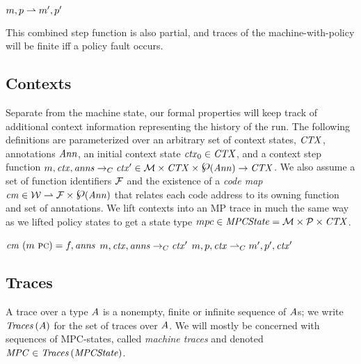 \documentclass[acmsmall,review,anonymous]{acmart}\settopmatter{printfolios=true,printccs=false,printacmref=false}
\newcommand{\powerset}{\raisebox{.15\baselineskip}{\Large\ensuremath{\wp}}}
\begin{document}
            {\(m,p \overset{}{\rightharpoonup}
               m',p'\)}

\noindent
This combined step function is also partial, and traces of the machine-with-policy
will be finite iff a policy fault occurs.

\subsection{Contexts}

Separate from the machine state, our formal properties will keep track of additional context
information representing the history of the run. The following definitions are parameterized
over an arbitrary set of context states, \(\mathit{CTX}\), annotations \(\mathit{Ann}\),
an initial context state \(\mathit{ctx}_0 \in \mathit{CTX}\), and a context step function
\(\mach, \context, \anns \constep \context' \in \MACHS \times \CONTEXTS
\times \powerset(\ANNS) \rightarrow \CONTEXTS\). We also assume a set of function identifiers
\(\mathcal{F}\) and the existence of a \emph{code map} \(\codemap \in \WORDS \rightharpoonup \FUNIDS \times \powerset(\ANNS)\)
that relates each code address to its owning function and set of annotations.
We lift contexts into an MP trace in much the same way as we lifted policy states to get
a state type \(mpc \in \mathit{MPCState} = {\mathcal M} \times \mathcal{P} \times
\mathit{CTX}\).  

              {\(\mathit{cm} ~ (m ~ \textsc{pc}) = f, \mathit{anns}\)}
              {\(m, \mathit{ctx}, \mathit{anns} \rightarrow_C \mathit{ctx}'\)}
              {\(m,p,\mathit{ctx} \overset{}{\rightharpoonup}_C
                m',p',\mathit{ctx}'\)}

\subsection{Traces}
\label{sec:traces}

A trace over a type \(A\) is a nonempty, finite or infinite sequence of
\(A\)s; we write \(\mathit{Traces}\,(A)\) for the set of traces over
\(A\). We will mostly be concerned with sequences of MPC-states,
called \emph{machine traces} and denoted \(\mathit{MPC} \in \mathit{Traces}\,(\mathit{MPCState})\). %
\end{document}
